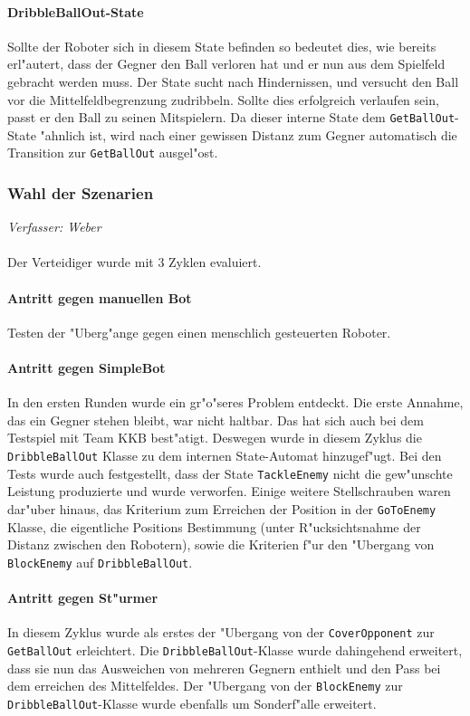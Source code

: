 \paragraph{DribbleBallOut-State}
Sollte der Roboter sich in diesem State befinden so bedeutet dies, wie bereits erl"autert, dass der Gegner den Ball verloren hat und er nun aus dem Spielfeld gebracht werden muss. Der State sucht nach Hindernissen, und versucht den Ball vor die Mittelfeldbegrenzung zudribbeln. Sollte dies erfolgreich verlaufen sein, passt er den Ball zu seinen Mitspielern. Da dieser interne State dem \lstinline{GetBallOut}-State "ahnlich ist, wird nach einer gewissen Distanz zum Gegner automatisch die Transition zur \lstinline{GetBallOut} ausgel"ost.

\subsubsection{Wahl der Szenarien}
\textit{Verfasser: Weber}\\
\\
Der Verteidiger wurde mit 3 Zyklen evaluiert.

\paragraph{Antritt gegen manuellen Bot}
Testen der "Uberg"ange gegen einen menschlich gesteuerten Roboter.

\paragraph{Antritt gegen SimpleBot}
In den ersten Runden wurde ein gr"o"seres Problem entdeckt. Die erste Annahme, das ein Gegner stehen bleibt, war nicht haltbar. Das hat sich auch bei dem Testspiel mit Team KKB best"atigt. Deswegen wurde in diesem Zyklus die \lstinline{DribbleBallOut} Klasse zu dem internen State-Automat hinzugef"ugt. Bei den Tests wurde auch festgestellt, dass der State \lstinline{TackleEnemy} nicht die gew"unschte Leistung produzierte und wurde verworfen. Einige weitere Stellschrauben waren dar"uber hinaus, das Kriterium zum Erreichen der Position in der \lstinline{GoToEnemy} Klasse, die eigentliche Positions Bestimmung (unter R"ucksichtsnahme der Distanz zwischen den Robotern), sowie die Kriterien f"ur den "Ubergang von \lstinline{BlockEnemy} auf \lstinline{DribbleBallOut}.

\paragraph{Antritt gegen St"urmer}
In diesem Zyklus wurde als erstes der "Ubergang von der \lstinline{CoverOpponent} zur \lstinline{GetBallOut} erleichtert. Die \lstinline{DribbleBallOut}-Klasse wurde dahingehend erweitert, dass sie nun das Ausweichen von mehreren Gegnern enthielt und den Pass bei dem erreichen des Mittelfeldes. Der "Ubergang von der \lstinline{BlockEnemy} zur \lstinline{DribbleBallOut}-Klasse wurde ebenfalls um Sonderf"alle erweitert.



